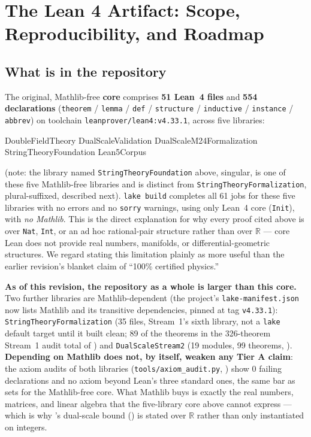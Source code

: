 \documentclass[11pt,a4paper]{article}
\theoremstyle{remark}
\begin{document}
\section{The Lean 4 Artifact: Scope, Reproducibility, and Roadmap}
\label{sec:formalization}

\subsection{What is in the repository}
The original, Mathlib-free \textbf{core} comprises \textbf{51 Lean~4 files} and \textbf{554
declarations} (\texttt{theorem} / \texttt{lemma} / \texttt{def} / \texttt{structure} /
\texttt{inductive} / \texttt{instance} / \texttt{abbrev}) on toolchain
\texttt{leanprover/\discretionary{}{}{}lean4:\discretionary{}{}{}v4.33.1}, across five libraries:
\begin{center}
\footnotesize\ttfamily
DoubleFieldTheory \quad DualScaleValidation \quad DualScaleM24Formalization \quad
StringTheoryFoundation \quad Lean5Corpus
\end{center}
(note: the library named \texttt{StringTheoryFoundation} above, singular, is one of these five
Mathlib-free libraries and is distinct from \texttt{StringTheoryFormalization}, plural-suffixed,
described next). \texttt{lake build} completes all 61 jobs for these five libraries with no errors
and no \texttt{sorry} warnings, using only Lean~4 core (\texttt{Init}), with \emph{no Mathlib}. This
is the direct explanation for why every proof cited above  is over \texttt{Nat},
\texttt{Int}, or an ad hoc rational-pair structure rather than over $\mathbb{R}$ --- core Lean does
not provide real numbers, manifolds, or differential-geometric structures. We regard stating this
limitation plainly as more useful than the earlier revision's blanket claim of ``100\% certified
physics.''

\textbf{As of this revision, the repository as a whole is larger than this core.} Two further
libraries are Mathlib-dependent (the project's \texttt{lake-manifest.json} now lists Mathlib and its
transitive dependencies, pinned at tag \texttt{v4.33.1}): \texttt{StringTheoryFormalization} (35
files, Stream~1's sixth library, not a \texttt{lake} default target until it built clean; 89 of the
theorems in the 326-theorem Stream~1 audit total of ) and
\texttt{DualScaleStream2} (19 modules, 99 theorems, ). \textbf{Depending on
Mathlib does not, by itself, weaken any Tier A claim}: the axiom audits of both libraries
(\texttt{tools/axiom\_\discretionary{}{}{}audit.py}, ) show 0 failing declarations
and no axiom beyond Lean's three standard ones, the same bar as  sets for the
Mathlib-free core. What Mathlib buys is exactly the real numbers, matrices, and linear algebra that
the five-library core above cannot express --- which is why 's dual-scale bound
() is stated over $\mathbb R$ rather than only instantiated on integers.
\end{document}
